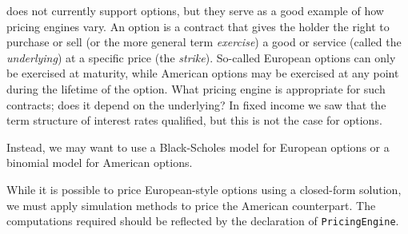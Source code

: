 \hql does not currently support options, but they serve as a good example
of how pricing engines vary. 
An option is a contract that gives the holder the right to purchase or sell
(or the more general term \emph{exercise}) a good or service (called the
\emph{underlying}) at a specific price (the \emph{strike}). So-called European
options can only be exercised at maturity, while American options may be 
exercised at any point during the lifetime of the option.
What pricing engine is appropriate for such contracts; does it depend on the
underlying? In fixed income we saw that the term structure of interest rates
qualified, but this is not the case for options.

Instead, we may want to use a Black-Scholes model for European
options or a binomial model for American options\cite{HULL}.

While it is possible to price European-style options using a closed-form 
solution, we must apply simulation methods to price the American counterpart.
The computations required should be reflected by the declaration of
\texttt{PricingEngine}.
